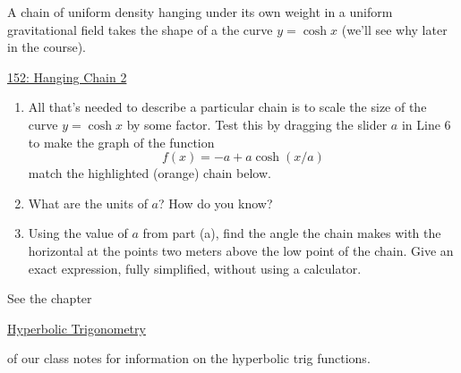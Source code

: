 \documentclass{ximera}
\begin{document}
\begin{question} \label{iifkdeyq3y}
A chain of uniform density hanging under its own weight in a uniform gravitational field takes the shape of a the curve $y=\cosh x$ (we'll see why later in the course).


\begin{onlineOnly}
    \begin{center}
\end{center}
\end{onlineOnly}

\href{https://www.desmos.com/calculator/iifkdeyq3y}{152: Hanging Chain 2}


\begin{enumerate} 


\item All that's needed to describe a particular chain is to scale the size of the curve $y=\cosh x$ by some factor. Test this by dragging the slider $a$ in Line 6 to make the graph of the function
\[
     f(x) = -a + a\cosh(x/a)
\]
match the highlighted (orange) chain below.

\item What are the units of $a$? How do you know?

\item Using the value of $a$ from part (a), find the angle the chain makes with the horizontal at the points two meters above the low point of the chain. Give an exact expression, fully simplified, without using a calculator.
\end{enumerate}

See the chapter

\href{https://ximera.osu.edu/calcone/Calculus1/HyperbolicTrig/HyperbolicTrig}{Hyperbolic Trigonometry}

of our class notes for information on the hyperbolic trig functions.

\end{question}
\end{document}
